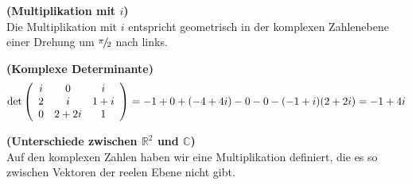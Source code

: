 \documentclass[11pt,a4paper,leqno]{article}
\newcommand{\smfrac}[2]%
{{\raise0.5ex\hbox{$\scriptstyle #1$} \kern-0.1em/\kern-0.15em \lower0.25ex\hbox{$\scriptstyle #2$}}}
\begin{document}
\begin{Gruppenuebungen}
\begin{itemize}
\begin{itemize}
   \end{itemize}
\end{itemize}


\Aufgabe %
\textbf{(Multiplikation mit $i$)}\\

Die Multiplikation mit $i$ entspricht geometrisch in der komplexen Zahlenebene einer Drehung um $\smfrac{\pi}{2}$ nach links.


\Aufgabe %
\textbf{(Komplexe Determinante)}\\
\[
\det \left( {\begin{array}{*{20}c}
   i & 0 & i  \\
   2 & i & {1 + i}  \\
   0 & {2 + 2i} & 1  \\
\end{array}} \right) =  - 1 + 0 + ( - 4 + 4i) - 0 - 0 - ( - 1 + i)(2 + 2i) =  - 1 + 4i
\]


\Aufgabe %
\textbf{(Unterschiede zwischen $\mathbb{R}^2$ und $\mathbb{C}$)}\\

Auf den komplexen Zahlen haben wir eine Multiplikation definiert, die es so zwischen Vektoren der reelen Ebene nicht gibt.

\end{Gruppenuebungen}
\end{document}
